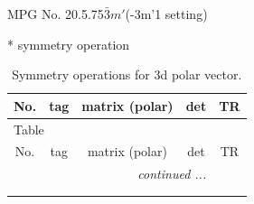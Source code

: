 \documentclass[fleqn,8pt]{jsarticle}
\begin{document}
\setcounter{MaxMatrixCols}{32}

\renewcommand{\tablename}{Table~}
\renewcommand{\figurename}{Figure~}
\begin{center}
\LARGE
MPG No. 20.5.75\quad$\bar{3}m'$\quad(-3m'1 setting)
\end{center}
* symmetry operation
\renewcommand{\arraystretch}{1.3}
\begin{longtable}{ccccc}
\caption{Symmetry operations for 3d polar vector.}
 \\
 \hline \hline
No. & tag & matrix (polar) & det & TR \\ \hline \endfirsthead

\multicolumn{4}{l}{\tablename\ \thetable{}} \\
 \hline \hline
No. & tag & matrix (polar) & det & TR \\ \hline \endhead

 \hline \hline
\multicolumn{4}{r}{\footnotesize\it continued ...} \\ \endfoot

 \hline \hline
\multicolumn{4}{r}{} \\ \endlastfoot


\end{longtable}
\end{document}

